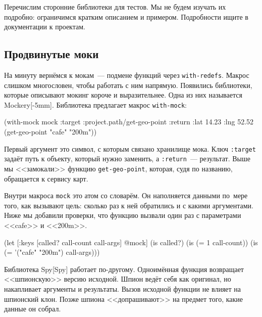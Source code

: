 Перечислим сторонние библиотеки для тестов. Мы не будем изучать их подробно:
ограничимся кратким описанием и примером. Подробности ищите в документации к
проектам.

\subsection{Продвинутые моки}


На минуту вернёмся к мокам~--- подмене функций через \verb|with-redefs|. Макрос
слишком многословен, чтобы работать с ним напрямую. Появились библиотеки,
которые описывают мокинг короче и выразительнее. Одна из них называется
Mockery[-5mm].  Библиотека предлагает
макрос \verb|with-mock|:

\begin{english}
  \begin{clojure}
(with-mock mock
  {:target :project.path/get-geo-point
   :return {:lat 14.23 :lng 52.52}}
  (get-geo-point "cafe" "200m"))
  \end{clojure}
\end{english}

Первый аргумент это символ, с которым связано хранилище мока. Ключ \verb|:target|
задаёт путь к объекту, который нужно заменить, а \verb|:return|~---
результат. Выше мы <<замокали>> функцию \verb|get-geo-point|, которая, судя по
названию, обращается к сервису карт.

Внутри макроса \verb|mock| это атом со словарём. Он наполняется данными по~мере
того, как вызывают цель: сколько раз к ней обратились и с какими
аргументами. Ниже мы добавили проверки, что функцию вызвали один раз с
параметрами <<cafe>> и <<200m>>.

\begin{english}
  \begin{clojure}
(let [{:keys [called? call-count call-args]} @mock]
  (is called?)
  (is (= 1 call-count))
  (is (= '("cafe" "200m") call-args)))
  \end{clojure}
\end{english}


Библиотека Spy[Spy] работает
по-другому. Одноимённая функция возвращает <<шпионскую>> версию исходной. Шпион
ведёт себя как оригинал, но накапливает аргументы и результаты. Вызов исходной
функции не влияет на шпионский клон. Позже шпиона <<допрашивают>> на предмет
того, какие данные он собрал.

